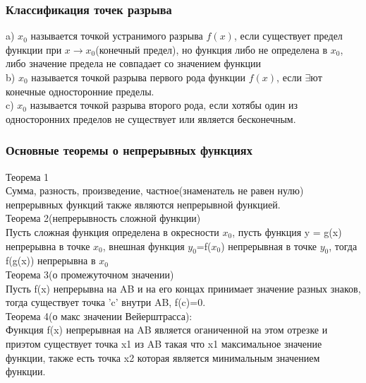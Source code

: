 \documentclass[a4paper, 12pt]{article}
\begin{document}
\subsubsection{Классификация точек разрыва}
a) $ x_0 $ называется точкой устранимого разрыва  $ f(x) $, если существует предел функции при $ x\to x_0 $(конечный предел), но функция либо не определена в $ x_0 $, либо значение предела не совпадает со значением функции\\
b) $ x_0 $ называется точкой разрыва первого рода функции $ f(x) $, если $ \exists  $ют конечные односторонние пределы.\\  
c) $ x_0 $ называется точкой разрыва второго рода, если хотябы один из односторонних пределов не существует или является бесконечным.\\

\newpage
\subsubsection{Основные теоремы о непрерывных функциях}

\begin{mdframed}[backgroundcolor=blue!20] 
      
       Теорема 1\\
       Сумма, разность, произведение, частное(знаменатель не равен нулю) непрерывных функций также являются непрерывной функцией.\\

       Теорема 2(непрерывность сложной функции)\\
       Пусть сложная функция определена в окресности $ x_0 $, пусть функция y = g(x) непрерывна в точке $ x_0 $, внешная функция $ y_0 $=f($ x_0 $) непрерывная в точке $ y_0 $, тогда f(g(x)) непрерывна в $ x_0 $\\

       Теорема 3(о промежуточном значении)\\
       Пусть f(x) непрерывна на AB и на его концах принимает значение разных знаков, тогда существует точка 'c' внутри AB, f(c)=0.\\

       Теорема 4(о макс значении Вейерштрасса):\\
       Функция f(x) непрерывная на AB является оганиченной на этом отрезке и приэтом существует точка x1 из AB такая что x1 максимальное значение функции, также есть точка x2 которая является минимальным значением функции.
    \end{mdframed}
\end{document}
